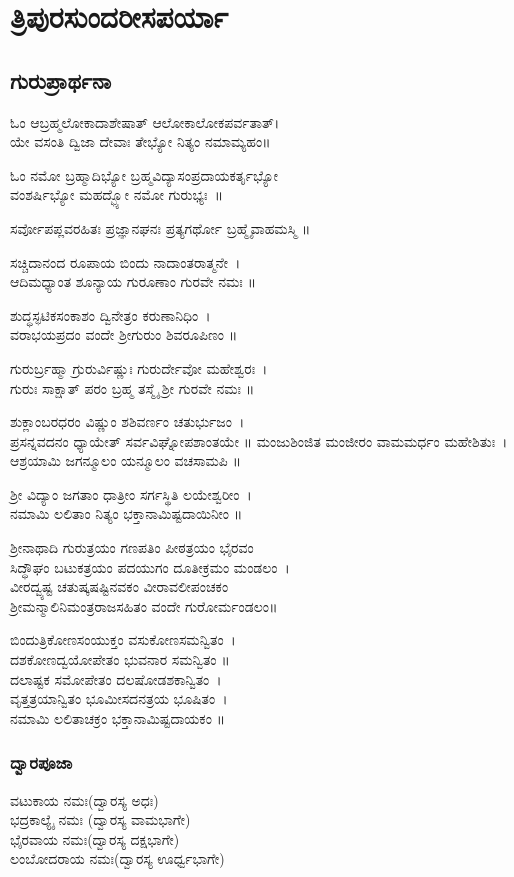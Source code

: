 \thispagestyle{empty}
\part*{ತ್ರಿಪುರಸುಂದರೀಸಪರ್ಯಾ}
\chapter*{\center ಗುರುಪ್ರಾರ್ಥನಾ}
\thispagestyle{empty}
ಓಂ ಆಬ್ರಹ್ಮಲೋಕಾದಾಶೇಷಾತ್ ಆಲೋಕಾಲೋಕಪರ್ವತಾತ್।\\
ಯೇ ವಸಂತಿ ದ್ವಿಜಾ ದೇವಾಃ ತೇಭ್ಯೋ ನಿತ್ಯಂ ನಮಾಮ್ಯಹಂ॥

ಓಂ ನಮೋ ಬ್ರಹ್ಮಾದಿಭ್ಯೋ ಬ್ರಹ್ಮವಿದ್ಯಾಸಂಪ್ರದಾಯಕರ್ತೃಭ್ಯೋ\\ ವಂಶರ್ಷಿಭ್ಯೋ ಮಹದ್ಭ್ಯೋ ನಮೋ ಗುರುಭ್ಯಃ~॥

ಸರ್ವೋಪಪ್ಲವರಹಿತಃ ಪ್ರಜ್ಞಾನಘನಃ ಪ್ರತ್ಯಗರ್ಥೋ ಬ್ರಹ್ಮೈವಾಹಮಸ್ಮಿ ॥

ಸಚ್ಚಿದಾನಂದ ರೂಪಾಯ ಬಿಂದು ನಾದಾಂತರಾತ್ಮನೇ~।\\
ಆದಿಮಧ್ಯಾಂತ ಶೂನ್ಯಾಯ ಗುರೂಣಾಂ ಗುರವೇ ನಮಃ ॥

ಶುದ್ಧಸ್ಫಟಿಕಸಂಕಾಶಂ ದ್ವಿನೇತ್ರಂ ಕರುಣಾನಿಧಿಂ~।\\
ವರಾಭಯಪ್ರದಂ ವಂದೇ ಶ್ರೀಗುರುಂ ಶಿವರೂಪಿಣಂ ॥

ಗುರುರ್ಬ್ರಹ್ಮಾ ಗ್ರುರುರ್ವಿಷ್ಣುಃ ಗುರುರ್ದೇವೋ ಮಹೇಶ್ವರಃ~।\\
ಗುರುಃ ಸಾಕ್ಷಾತ್ ಪರಂ ಬ್ರಹ್ಮ ತಸ್ಮೈ ಶ್ರೀ ಗುರವೇ ನಮಃ ॥

ಶುಕ್ಲಾಂಬರಧರಂ ವಿಷ್ಣುಂ ಶಶಿವರ್ಣಂ ಚತುರ್ಭುಜಂ~।\\
ಪ್ರಸನ್ನವದನಂ ಧ್ಯಾಯೇತ್ ಸರ್ವವಿಘ್ನೋಪಶಾಂತಯೇ ॥
\eject
ಮಂಜುಶಿಂಜಿತ ಮಂಜೀರಂ ವಾಮಮರ್ಧಂ ಮಹೇಶಿತುಃ~।\\
ಆಶ್ರಯಾಮಿ ಜಗನ್ಮೂಲಂ ಯನ್ಮೂಲಂ ವಚಸಾಮಪಿ ॥

ಶ್ರೀ ವಿದ್ಯಾಂ ಜಗತಾಂ ಧಾತ್ರೀಂ ಸರ್ಗಸ್ಥಿತಿ ಲಯೇಶ್ವರೀಂ~।\\
ನಮಾಮಿ ಲಲಿತಾಂ ನಿತ್ಯಂ ಭಕ್ತಾನಾಮಿಷ್ಟದಾಯಿನೀಂ ॥

ಶ್ರೀನಾಥಾದಿ ಗುರುತ್ರಯಂ ಗಣಪತಿಂ ಪೀಠತ್ರಯಂ ಭೈರವಂ\\
ಸಿದ್ಧೌಘಂ ಬಟುಕತ್ರಯಂ ಪದಯುಗಂ ದೂತೀಕ್ರಮಂ ಮಂಡಲಂ~।\\
ವೀರದ್ವ್ಯಷ್ಟ ಚತುಷ್ಕಷಷ್ಟಿನವಕಂ ವೀರಾವಲೀಪಂಚಕಂ\\
ಶ್ರೀಮನ್ಮಾಲಿನಿಮಂತ್ರರಾಜಸಹಿತಂ ವಂದೇ ಗುರೋರ್ಮಂಡಲಂ॥

ಬಿಂದುತ್ರಿಕೋಣಸಂಯುಕ್ತಂ ವಸುಕೋಣಸಮನ್ವಿತಂ~।\\
ದಶಕೋಣದ್ವಯೋಪೇತಂ ಭುವನಾರ ಸಮನ್ವಿತಂ ॥\\
ದಲಾಷ್ಟಕ ಸಮೋಪೇತಂ ದಲಷೋಡಶಕಾನ್ವಿತಂ~।\\
ವೃತ್ತತ್ರಯಾನ್ವಿತಂ ಭೂಮೀಸದನತ್ರಯ ಭೂಷಿತಂ~।\\
ನಮಾಮಿ ಲಲಿತಾಚಕ್ರಂ ಭಕ್ತಾನಾಮಿಷ್ಟದಾಯಕಂ ॥
\section{ದ್ವಾರಪೂಜಾ}
 ವಟುಕಾಯ ನಮಃ(ದ್ವಾರಸ್ಯ ಅಧಃ)\\
 ಭದ್ರಕಾಲ್ಯೈ ನಮಃ (ದ್ವಾರಸ್ಯ ವಾಮಭಾಗೇ)\\
 ಭೈರವಾಯ ನಮಃ(ದ್ವಾರಸ್ಯ ದಕ್ಷಭಾಗೇ)\\
 ಲಂಬೋದರಾಯ ನಮಃ(ದ್ವಾರಸ್ಯ ಊರ್ಧ್ವಭಾಗೇ)
